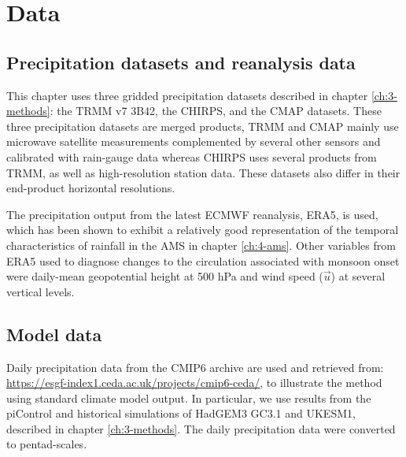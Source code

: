 \section{Data}

\subsection{Precipitation datasets and reanalysis data}

This chapter uses three gridded precipitation datasets described in chapter \ref{ch:3-methods}: the TRMM v7 3B42, the CHIRPS, and the CMAP datasets.
These three precipitation datasets are merged products, TRMM and CMAP mainly use microwave satellite measurements complemented by several other sensors and calibrated with rain-gauge data whereas CHIRPS uses several products from TRMM, as well as high-resolution station data. These datasets also differ in their end-product horizontal resolutions.

The precipitation output from the latest ECMWF reanalysis, ERA5, is used, which has been shown to exhibit a relatively good representation of the temporal characteristics of rainfall in the AMS in chapter \ref{ch:4-ams}. 
Other variables from ERA5 used to diagnose changes to the circulation associated with monsoon onset were daily-mean geopotential height at 500 hPa and wind speed ($\vec{u}$) at several vertical levels. 

\subsection{Model data}


Daily precipitation data from the CMIP6 archive are used and retrieved from: \url{https://esgf-index1.ceda.ac.uk/projects/cmip6-ceda/}, to illustrate the method using standard climate model output.
In particular, we use results from the piControl and historical simulations of HadGEM3 GC3.1 and UKESM1, described in chapter \ref{ch:3-methods}.
The daily precipitation data were converted to pentad-scales.


